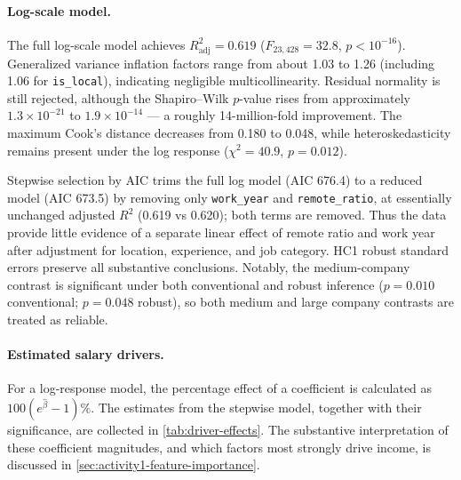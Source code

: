 \paragraph{Log-scale model.}
The full log-scale model achieves $R^2_{\mathrm{adj}}=0.619$
($F_{23,428}=32.8$, $p<10^{-16}$). Generalized variance inflation factors range from
about 1.03 to 1.26 (including 1.06 for \texttt{is\_local}), indicating negligible
multicollinearity. Residual normality is still rejected, although the
Shapiro--Wilk $p$-value rises from approximately $1.3 \times 10^{-21}$ to
$1.9 \times 10^{-14}$ --- a roughly 14-million-fold improvement. The maximum
Cook's distance decreases from 0.180 to 0.048, while heteroskedasticity remains
present under the log response ($\chi^2=40.9$, $p=0.012$).

Stepwise selection by AIC trims the full log model (AIC 676.4) to a reduced model
(AIC 673.5) by removing only \texttt{work\_year} and \texttt{remote\_ratio}, at
essentially unchanged adjusted $R^2$ (0.619 vs 0.620); both terms are removed.
Thus the data provide little evidence of a separate linear effect of
remote ratio and work year after adjustment for location, experience, and job
category. HC1 robust standard errors preserve all substantive conclusions.
Notably, the medium-company contrast is significant under both conventional
and robust inference ($p=0.010$ conventional; $p=0.048$ robust), so both
medium and large company contrasts are treated as reliable.

\paragraph{Estimated salary drivers.}
For a log-response model, the percentage effect of a coefficient is calculated as
$100(e^{\hat{\beta}}-1)\%$. The estimates from the stepwise model, together with
their significance, are collected in \cref{tab:driver-effects}. The substantive
interpretation of these coefficient magnitudes, and which factors most strongly
drive income, is discussed in \cref{sec:activity1-feature-importance}.

